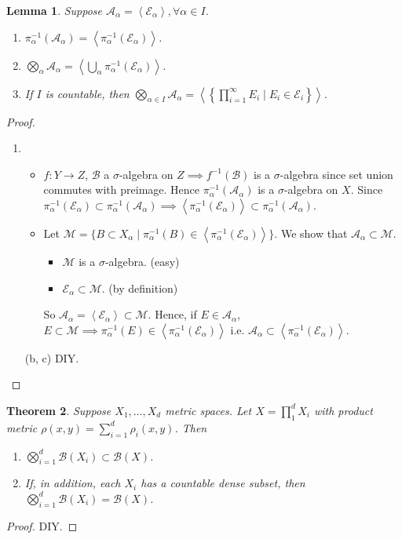 \documentclass{report}
\newcommand{\cA}{\mathcal{A}}
\newcommand{\cB}{\mathcal{B}}
\newcommand{\cE}{\mathcal{E}}
\newcommand{\cM}{\mathcal{M}}
\newcommand{\gen}[1]{\left\langle #1 \right\rangle}
\newtheorem{theorem}{Theorem}[chapter]
\newtheorem{lemma}[theorem]{Lemma}
\theoremstyle{definition}
\theoremstyle{remark}
\newcommand{\fnl}{\parbox[t]{0\linewidth}{}}
\begin{document}
\begin{lemma}
	Suppose $\cA_\alpha = \gen{\cE_\alpha}, \forall \alpha \in I$.
	\begin{enumerate}
		\item $\pi^{-1}_\alpha(\cA_\alpha) = \gen{\pi^{-1}_\alpha(\cE_\alpha)}$.
		\item $\displaystyle \bigotimes_\alpha \cA_\alpha = \gen{\bigcup_\alpha\pi^{-1}_\alpha(\cE_\alpha)}$.
		\item If $I$ is countable, then $\displaystyle \bigotimes_{\alpha \in I} \cA_\alpha = \gen{\left\lbrace \prod_{i=1}^\infty E_i \mid E_i \in \cE_i \right\rbrace}$.
	\end{enumerate}
\end{lemma}
\begin{proof}\fnl
	\begin{enumerate}
		\item  \begin{itemize}
			\item $f: Y \to Z$, $\cB$ a $\sigma$-algebra on $Z \implies f^{-1}(\cB)$ is a $\sigma$-algebra since set union commutes with preimage. Hence $\pi^{-1}_\alpha(\cA_\alpha)$ is a $\sigma$-algebra on $X$. Since $\pi^{-1}_\alpha(\cE_\alpha) \subset \pi^{-1}_\alpha(\cA_\alpha) \implies \gen{\pi^{-1}_\alpha(\cE_\alpha)} \subset \pi^{-1}_\alpha(\cA_\alpha)$.
			\item Let $\cM = \{B \subset X_\alpha \mid \pi^{-1}_\alpha(B) \in \gen{\pi^{-1}_\alpha(\cE_\alpha)}\}$. We show that $\cA_\alpha \subset \cM$. \begin{itemize}
				\item $\cM$ is a $\sigma$-algebra. (easy)
				\item $\cE_\alpha \subset \cM$. (by definition)
			\end{itemize}
			So $\cA_\alpha = \gen{\cE_\alpha} \subset \cM$. Hence, if $E \in \cA_\alpha$, $E \subset \cM \implies \pi^{-1}_\alpha(E) \in \gen{\pi^{-1}_\alpha(\cE_\alpha)}$ i.e. $\cA_\alpha \subset \gen{\pi^{-1}_\alpha(\cE_\alpha)}$.
			\end{itemize}
		\item[(b, c)] DIY. \qedhere
	\end{enumerate}
\end{proof}

\begin{theorem}
	Suppose $X_1, \ldots, X_d$ metric spaces. Let $\displaystyle X = \prod_1^d X_i$ with product metric $\displaystyle \rho(x, y) = \sum_{i=1}^d \rho_i(x, y)$. Then \begin{enumerate}
		\item $\displaystyle \bigotimes_{i=1}^d \cB(X_i) \subset \cB(X)$.
		\item If, in addition, each $X_i$ has a countable dense subset, then $\displaystyle \bigotimes_{i=1}^d \cB(X_i) = \cB(X)$.
	\end{enumerate}
\end{theorem}
\begin{proof}
	DIY.
\end{proof}
\end{document}
